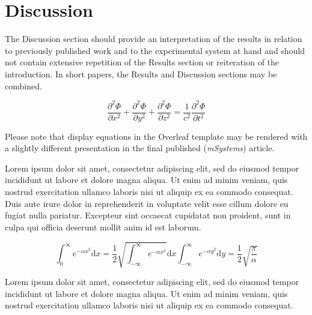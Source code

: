 \documentclass[lineno]{asm-article}
\begin{document}
\section{Discussion}
The Discussion section should provide an interpretation of the results in relation to previously published work and to the experimental system at hand and should not contain extensive repetition of the Results section or reiteration of the introduction. In short papers, the Results and Discussion sections may be combined.

\begin{equation}
\frac{\partial^2 \Phi}{\partial x^2} + \frac{\partial^2 \Phi}{\partial y^2} +
            \frac{\partial^2 \Phi}{\partial z^2} =
            \frac{1}{c^2}\frac{\partial^2\Phi}{\partial t^2}
\end{equation}

Please note that display equations in the Overleaf template may be rendered with a slightly different presentation in the final published (\textit{mSystems}) article.

Lorem ipsum dolor sit amet, consectetur adipiscing elit, sed do eiusmod tempor incididunt ut labore et dolore magna aliqua. Ut enim ad minim veniam, quis nostrud exercitation ullamco laboris nisi ut aliquip ex ea commodo consequat. Duis aute irure dolor in reprehenderit in voluptate velit esse cillum dolore eu fugiat nulla pariatur. Excepteur sint occaecat cupidatat non proident, sunt in culpa qui officia deserunt mollit anim id est laborum.

\begin{equation}
\int_0^\infty e^{-\alpha x^2} \mathrm{d}x =
            \frac12\sqrt{\int_{-\infty}^\infty e^{-\alpha x^2}}
            \mathrm{d}x\int_{-\infty}^\infty e^{-\alpha y^2}\mathrm{d}y =
            \frac12\sqrt{\frac{\pi}{\alpha}}
\end{equation}

Lorem ipsum dolor sit amet, consectetur adipiscing elit, sed do eiusmod tempor incididunt ut labore et dolore magna aliqua. Ut enim ad minim veniam, quis nostrud exercitation ullamco laboris nisi ut aliquip ex ea commodo consequat. 

\end{document}
